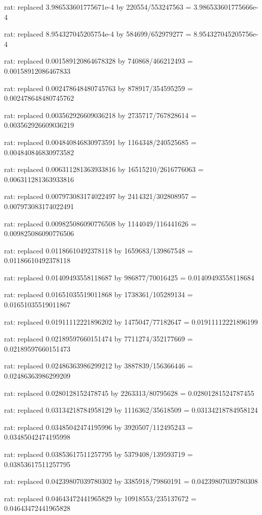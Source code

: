 \documentclass[a4paper,10pt]{article}
\begin{document}
\begin{eulernotebook}
\begin{eulercomment}
\begin{eulercomment}
\begin{eulercomment}
\begin{eulercomment}
\begin{eulercomment}
\begin{eulercomment}
\begin{eulercomment}
\begin{eulercomment}
\begin{eulercomment}
\begin{eulercomment}
\begin{eulercomment}
\begin{eulercomment}
\begin{eulercomment}
\begin{eulercomment}
\begin{eulercomment}
\begin{eulercomment}
\begin{euleroutput}
  rat: replaced 3.986533601775671e-4 by 220554/553247563 = 3.986533601775666e-4
  
  rat: replaced 8.954327045205754e-4 by 584699/652979277 = 8.954327045205756e-4
  
  rat: replaced 0.001589120864678328 by 740868/466212493 = 0.00158912086467833
  
  rat: replaced 0.002478648480745763 by 878917/354595259 = 0.002478648480745762
  
  rat: replaced 0.003562926609036218 by 2735717/767828614 = 0.003562926609036219
  
  rat: replaced 0.004840846830973591 by 1164348/240525685 = 0.004840846830973582
  
  rat: replaced 0.006311281363933816 by 16515210/2616776063 = 0.006311281363933816
  
  rat: replaced 0.007973083174022497 by 2414321/302808957 = 0.007973083174022491
  
  rat: replaced 0.009825086090776508 by 1144049/116441626 = 0.009825086090776506
  
  rat: replaced 0.01186610492378118 by 1659683/139867548 = 0.01186610492378118
  
  rat: replaced 0.01409493558118687 by 986877/70016425 = 0.01409493558118684
  
  rat: replaced 0.01651035519011868 by 1738361/105289134 = 0.01651035519011867
  
  rat: replaced 0.01911112221896202 by 1475047/77182647 = 0.01911112221896199
  
  rat: replaced 0.02189597660151474 by 7711274/352177669 = 0.02189597660151473
  
  rat: replaced 0.02486363986299212 by 3887839/156366446 = 0.02486363986299209
  
  rat: replaced 0.0280128152478745 by 2263313/80795628 = 0.02801281524787455
  
  rat: replaced 0.03134218784958129 by 1116362/35618509 = 0.03134218784958124
  
  rat: replaced 0.03485042474195996 by 3920507/112495243 = 0.03485042474195998
  
  rat: replaced 0.03853617511257795 by 5379408/139593719 = 0.03853617511257795
  
  rat: replaced 0.04239807039780302 by 3385918/79860191 = 0.04239807039780308
  
  rat: replaced 0.04643472441965829 by 10918553/235137672 = 0.04643472441965828
  

\end{euleroutput}
\end{eulercomment}
\end{eulercomment}
\end{eulercomment}
\end{eulercomment}
\end{eulercomment}
\end{eulercomment}
\end{eulercomment}
\end{eulercomment}
\end{eulercomment}
\end{eulercomment}
\end{eulercomment}
\end{eulercomment}
\end{eulercomment}
\end{eulercomment}
\end{eulercomment}
\end{eulercomment}
\end{eulernotebook}
\end{document}

